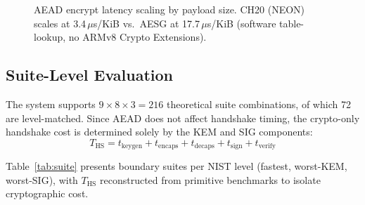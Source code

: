\begin{figure}[t]
\centering
{}
\caption{AEAD encrypt latency scaling by payload size.  CH20 (NEON)
  scales at 3.4\,$\mu$s/KiB vs.\ AESG at 17.7\,$\mu$s/KiB (software
  table-lookup, no ARMv8 Crypto Extensions).}
\label{fig:aead_scaling}
\end{figure}

\subsection{Suite-Level Evaluation}
\label{sec:suite}

The system supports $9 \times 8 \times 3 = 216$ theoretical suite
combinations, of which 72 are level-matched.  Since AEAD does not
affect handshake timing, the crypto-only handshake cost is determined
solely by the KEM and SIG components:
\begin{equation}
T_\text{HS} = t_\text{keygen} + t_\text{encaps} + t_\text{decaps}
            + t_\text{sign} + t_\text{verify}
\label{eq:ths}
\end{equation}

Table~\ref{tab:suite} presents boundary suites per NIST level
(fastest, worst-KEM, worst-SIG), with $T_\text{HS}$ reconstructed
from primitive benchmarks to isolate cryptographic cost.

